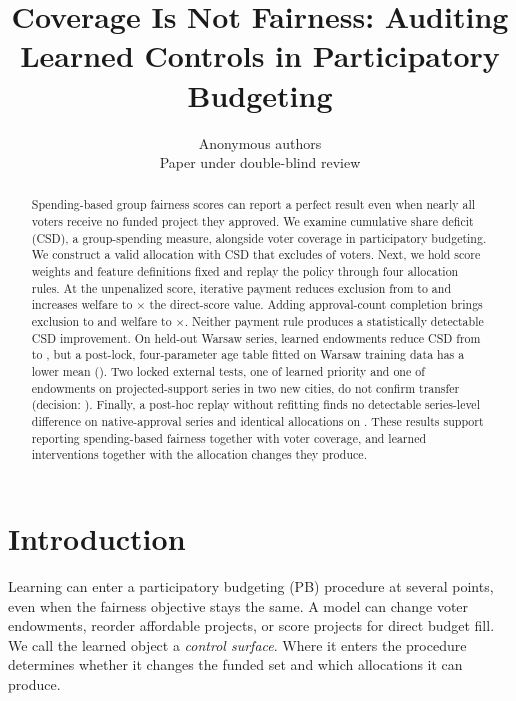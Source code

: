 \documentclass{article}
\title{Coverage Is Not Fairness: Auditing Learned Controls in Participatory Budgeting}
\author{Anonymous authors\\Paper under double-blind review}
\begin{document}
\maketitle

\begin{abstract}
Spending-based group fairness scores can report a perfect result even when
nearly all voters receive no funded project they approved. We examine
cumulative share deficit (CSD), a group-spending measure, alongside voter
coverage in participatory budgeting. We construct a valid allocation with CSD
\DegCSD{} that excludes \DegExcl{} of voters. Next, we hold score weights and
feature definitions fixed and replay the policy through four allocation rules.
At the unpenalized score, iterative payment reduces exclusion from
\KernelDirectExcl{} to \KernelPaymentOnlyExcl{} and increases welfare to
\KernelPaymentOnlyWelfareFactor$\times$ the direct-score value. Adding
approval-count completion brings exclusion to \KernelPaymentCompleteExcl{}
and welfare to \KernelPaymentCompleteWelfareFactor$\times$. Neither payment
rule produces a statistically detectable CSD improvement. On
\EvalSeriesN{} held-out Warsaw series, learned endowments reduce CSD from
\TestMESCSD{} to \EndowCSD{}, but a post-lock, four-parameter age table fitted
on Warsaw training data has a lower mean (\AgeLookupCSD{}). Two locked
external tests, one of learned priority and one of endowments on
\ExternalSeriesN{} projected-support series in two new cities, do not confirm
transfer (decision: \texttt{\ExternalDecision}). Finally, a post-hoc replay
without refitting finds no detectable series-level difference on
\CrossCityAllSeriesN{} native-approval series and identical allocations on
\CrossCityInertN{}. These results support reporting spending-based fairness
together with voter coverage, and learned interventions together with the
allocation changes they produce.
\end{abstract}

\section{Introduction}

Learning can enter a participatory budgeting (PB) procedure at several points,
even when the fairness objective stays the same. A model can change voter
endowments, reorder affordable projects, or score projects for direct budget
fill. We call the learned object a \emph{control surface}. Where it enters the
procedure determines whether it changes the funded set and which allocations
it can produce.
\end{document}
